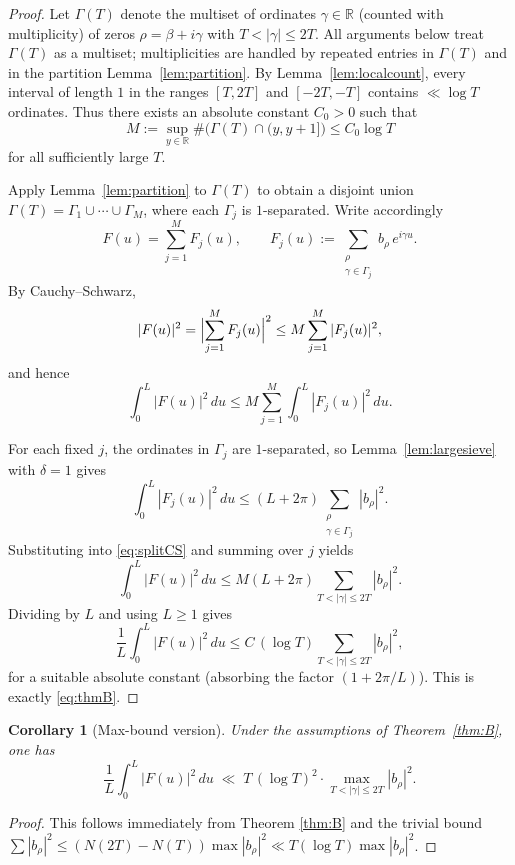 \documentclass[11pt]{article}
\theoremstyle{plain}
\newtheorem{corollary}[theorem]{Corollary}
\theoremstyle{definition}
\begin{document}
\begin{proof}
Let $\Gamma(T)$ denote the multiset of ordinates $\gamma\in\mathbb{R}$ (counted with multiplicity) of zeros
$\rho=\beta+i\gamma$ with $T<|\gamma|\le 2T$.
All arguments below treat $\Gamma(T)$ as a multiset; multiplicities are handled
by repeated entries in $\Gamma(T)$ and in the partition Lemma~\ref{lem:partition}.
By Lemma~\ref{lem:localcount}, every interval of length $1$ in the ranges $[T,2T]$ and $[-2T,-T]$
contains $\ll \log T$ ordinates. Thus there exists an absolute constant $C_0>0$ such that
\[
  M:=\sup_{y\in\mathbb{R}}\#\bigl(\Gamma(T)\cap (y,y+1]\bigr) \le C_0\log T
\]
for all sufficiently large $T$.

Apply Lemma~\ref{lem:partition} to $\Gamma(T)$ to obtain a disjoint union
$\Gamma(T)=\Gamma_1\cup\cdots\cup \Gamma_M$, where each $\Gamma_j$ is $1$-separated.
Write accordingly
\[
  F(u)=\sum_{j=1}^M F_j(u),
  \qquad
  F_j(u):=\sum_{\substack{\rho\\ \gamma\in\Gamma_j}} b_\rho\,e^{i\gamma u}.
\]
By Cauchy--Schwarz,
\[
  |F(u)|^2 = \Bigl|\sum_{j=1}^M F_j(u)\Bigr|^2 \le M \sum_{j=1}^M |F_j(u)|^2,
\]
and hence
\begin{equation}\label{eq:splitCS}
  \int_0^L |F(u)|^2\,du \le M \sum_{j=1}^M \int_0^L |F_j(u)|^2\,du.
\end{equation}

For each fixed $j$, the ordinates in $\Gamma_j$ are $1$-separated, so Lemma~\ref{lem:largesieve} with $\delta=1$ gives
\[
  \int_0^L |F_j(u)|^2\,du \le (L+2\pi)\sum_{\substack{\rho\\ \gamma\in\Gamma_j}} |b_\rho|^2.
\]
Substituting into \eqref{eq:splitCS} and summing over $j$ yields
\[
  \int_0^L |F(u)|^2\,du
  \le M(L+2\pi)\sum_{T<|\gamma|\le 2T} |b_\rho|^2.
\]
Dividing by $L$ and using $L\ge 1$ gives
\[
  \frac{1}{L}\int_0^L |F(u)|^2\,du
  \le C\,(\log T)\sum_{T<|\gamma|\le 2T} |b_\rho|^2,
\]
for a suitable absolute constant (absorbing the factor $(1+2\pi/L)$). This is exactly \eqref{eq:thmB}.
\end{proof}

\begin{corollary}[Max-bound version]\label{cor:max}
Under the assumptions of Theorem~\ref{thm:B}, one has
\[
  \frac{1}{L} \int_0^L |F(u)|^2 \, du
    \;\ll\; T \,(\log T)^{2} \cdot \max_{T<|\gamma|\le 2T} |b_\rho|^2.
\]
\end{corollary}
\begin{proof}
This follows immediately from Theorem \ref{thm:B} and the trivial bound $\sum |b_\rho|^2 \le (N(2T)-N(T)) \max |b_\rho|^2 \ll T (\log T) \max |b_\rho|^2$.
\end{proof}
\end{document}
